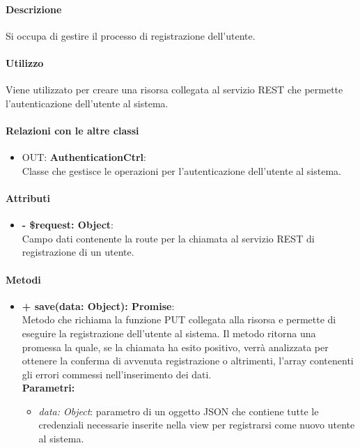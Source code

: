		\paragraph{Descrizione}
		Si occupa di gestire il processo di registrazione dell'utente.
		
		\paragraph{Utilizzo}
		Viene utilizzato per creare una risorsa collegata al servizio \gls{REST} che permette l'autenticazione dell'utente al sistema.
		
		\paragraph{Relazioni con le altre classi}
		\begin{itemize}
			\item OUT: \textbf{AuthenticationCtrl}:\\
			Classe che gestisce le operazioni per l'autenticazione dell'utente al sistema.
		\end{itemize}
		
		\paragraph{Attributi}
		\begin{itemize}
			\item \textbf{- \$request: Object}:\\
			Campo dati contenente la route per la chiamata al servizio \gls{REST} di registrazione di un utente.
		\end{itemize}	
		
		\paragraph{Metodi}
		\begin{itemize}
			\item \textbf{+ save(data: Object): Promise}:\\
			Metodo che richiama la funzione PUT collegata alla risorsa e permette di eseguire la registrazione dell'utente al sistema. Il metodo ritorna una promessa la quale, se la chiamata ha esito positivo, verrà analizzata per ottenere la conferma di avvenuta registrazione o altrimenti, l'array contenenti gli errori commessi nell'inserimento dei dati.\\
			\textbf{Parametri:}\\
			\begin{itemize}
				\item \textit{data: Object}: parametro di un oggetto \gls{JSON} che contiene tutte le credenziali necessarie inserite nella view per registrarsi come nuovo utente al sistema.
			\end{itemize}
		\end{itemize}
\newpage
		
